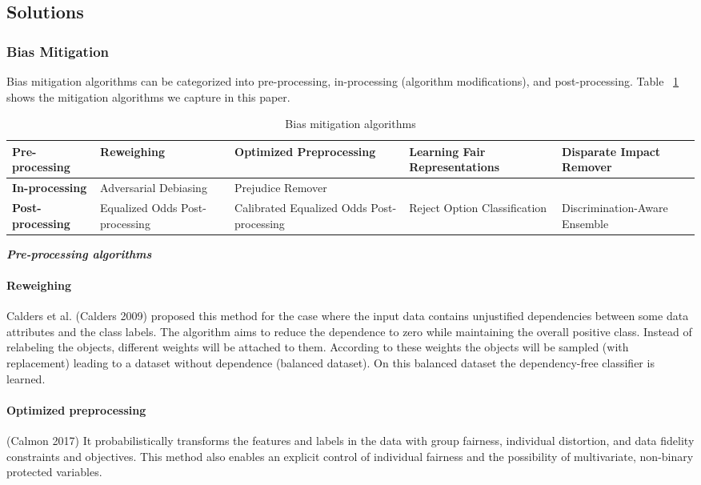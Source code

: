 \documentclass{article}
\begin{document}
\subsection{Solutions}
\subsubsection{Bias Mitigation}
Bias mitigation algorithms can be categorized into pre-processing, in-processing (algorithm modifications), and post-processing. Table ~\ref{table1} shows the mitigation algorithms we capture in this paper. 
\begin{table}[]
  \caption{Bias mitigation algorithms}
  \label{table1}
\begin{adjustbox}{width=1\textwidth}
\begin{tabular}{|l|l|l|l|l|}
\hline
\textbf{Pre-processing}  & Reweighing                    & Optimized Preprocessing                  & Learning Fair Representations & Disparate Impact Remover      \\ \hline
\textbf{In-processing}   & Adversarial Debiasing          & Prejudice Remover                        &                               &                               \\ \hline
\textbf{Post-processing} & Equalized Odds Post-processing & Calibrated Equalized Odds Post-processing & Reject Option Classification  & Discrimination-Aware Ensemble \\ \hline
\end{tabular}
\end{adjustbox}
\end{table}

\textbf{\textit{Pre-processing algorithms}}
\paragraph{Reweighing}
Calders et al. (Calders 2009) proposed this method for the case where the input data contains unjustified dependencies between some data attributes and the class labels. The algorithm aims to reduce the dependence to zero while maintaining the overall positive class. Instead of relabeling the objects, different weights will be attached to them. According to these weights the objects will be sampled (with replacement) leading to a dataset without dependence (balanced dataset). On this balanced dataset the dependency-free classifier is learned.
\paragraph{Optimized preprocessing}
 (Calmon 2017) It probabilistically transforms the features and labels in the data with group fairness, individual distortion, and data fidelity constraints and objectives. This method also enables an explicit control of individual fairness and the possibility of multivariate, non-binary protected variables. 
\end{document}
